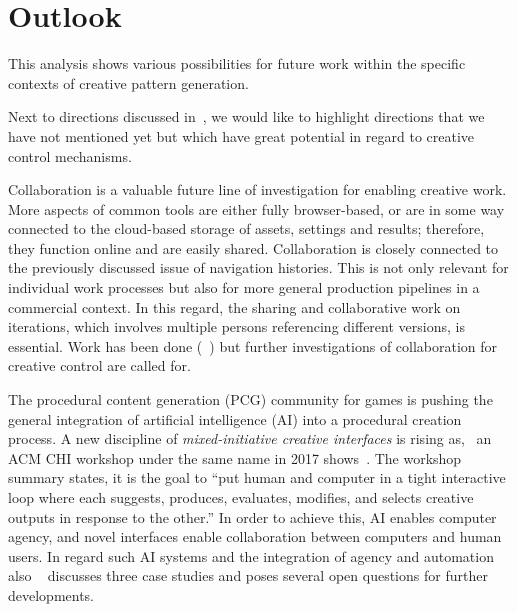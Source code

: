 
\section{Outlook}
\label{sec:outlook}

This analysis shows various possibilities for future work within the specific contexts of creative pattern generation. 


%


Next to directions discussed in~, we would like to highlight directions that we have not mentioned yet but which have great potential in regard to creative control mechanisms.

Collaboration is a valuable future line of investigation for enabling creative work. More aspects of common tools are either fully browser-based, or are in some way connected to the cloud-based storage of assets, settings and results; therefore, they function online and are easily shared. Collaboration is closely connected to the previously discussed issue of navigation histories. This is not only relevant for individual work processes but also for more general production pipelines in a commercial context. In this regard, the sharing and collaborative work on iterations, which involves multiple persons referencing different versions, is essential. Work has been done (\eg~\cite{talton_2009_emw, salvati_2015_mcm,oleary_2018_csi}) but further investigations of collaboration for creative control are called for. 

The procedural content generation (PCG) community for games is pushing the general integration of artificial intelligence (AI) into a procedural creation process. A new discipline of \textit{mixed-initiative creative interfaces} is rising as, \eg~an ACM CHI workshop under the same name in 2017 shows~\cite{deterding_2017_mci}. The workshop summary states, it is the goal to ``put human and computer in a tight interactive loop where each suggests, produces, evaluates, modifies, and selects creative outputs in response to the other.'' In order to achieve this, AI enables computer agency, and novel interfaces enable collaboration between computers and human users. In regard such AI systems and the integration of agency and automation also \citeauthor*{heer_2019_apa}~\cite{heer_2019_apa} discusses three case studies and poses several open questions for further developments.

